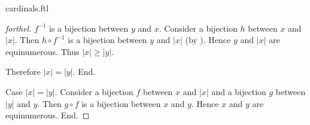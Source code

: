 \documentclass{naproche-library}
\begin{document}
\begin{smodule}{cardinals.ftl}
\begin{proof}[forthel]
      $f^{-1}$ is a bijection between $y$ and $x$.
      Consider a bijection $h$ between $x$ and $|x|$.
      Then $h \circ f^{-1}$ is a bijection between $y$ and $|x|$ (by ).
      Hence $y$ and $|x|$ are equinumerous.
      Thus $|x| \geq |y|$.

      Therefore $|x| = |y|$.
    End.

    Case $|x| = |y|$.
      Consider a bijection $f$ between $x$ and $|x|$ and a bijection $g$
      between $|y|$ and $y$.
      Then $g \circ f$ is a bijection between $x$ and $y$.
      Hence $x$ and $y$ are equinumerous.
    End.
  \end{proof}
\end{smodule}
\end{document}
